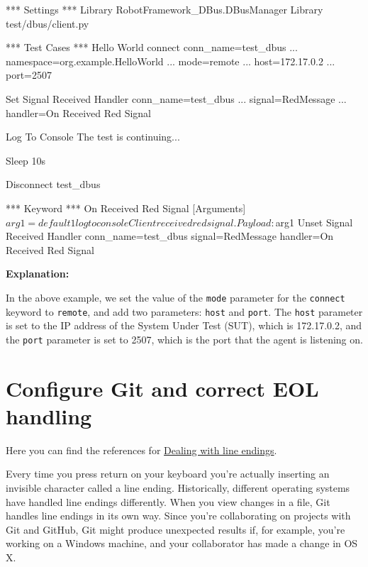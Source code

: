\begin{robotcode}
*** Settings ***
Library    RobotFramework_DBus.DBusManager
Library    test/dbus/client.py

*** Test Cases ***
Hello World
   connect    conn_name=test_dbus
   ...        namespace=org.example.HelloWorld
   ...        mode=remote
   ...        host=172.17.0.2
   ...        port=2507

   Set Signal Received Handler    conn_name=test_dbus
   ...                            signal=RedMessage
   ...                            handler=On Received Red Signal

   Log To Console    The test is continuing...

   Sleep    10s

   Disconnect    test_dbus

*** Keyword ***
On Received Red Signal
   [Arguments]    ${arg1}=default 1
   log to console      Client received red signal. Payload: ${arg1}
   Unset Signal Received Handler    conn_name=test_dbus    signal=RedMessage    handler=On Received Red Signal
\end{robotcode}

\textbf{Explanation:}

In the above example, we set the value of the \texttt{mode} parameter for the \texttt{connect} keyword to \texttt{remote}, and add two parameters: \texttt{host}
and \texttt{port}. The \texttt{host} parameter is set to the IP address of the System Under Test (SUT), which is 172.17.0.2, and the \texttt{port} parameter is set
to 2507, which is the port that the agent is listening on.


\hypertarget{configure-git-and-correct-eol-handling}{%
\section{Configure Git and correct EOL
handling}\label{configure-git-and-correct-eol-handling}}

Here you can find the references for
\href{https://help.github.com/articles/dealing-with-line-endings/}{Dealing
with line endings}.

Every time you press return on your keyboard you're actually inserting
an invisible character called a line ending. Historically, different
operating systems have handled line endings differently. When you view
changes in a file, Git handles line endings in its own way. Since you're
collaborating on projects with Git and GitHub, Git might produce
unexpected results if, for example, you're working on a Windows machine,
and your collaborator has made a change in OS X.

